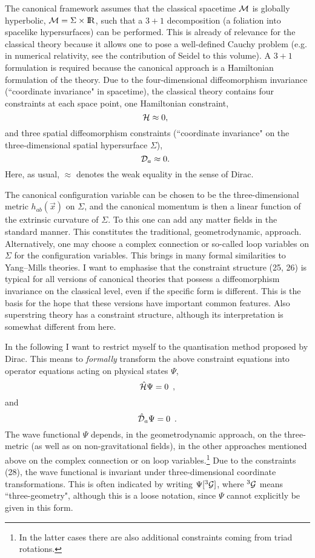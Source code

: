 \documentclass[12pt]{article}
\def\bbbr{{\rm I\!R}} %
\newcommand{\be}{\begin{equation}}
\newcommand{\ee}{\end{equation}}
\begin{document}
The canonical framework assumes that the classical spacetime ${\cal M}$
is globally hyperbolic, ${\cal M}=\Sigma\times\bbbr$, such that 
a $3+1$ decomposition (a foliation into spacelike hypersurfaces)
can be performed. This is already of relevance for the
classical theory because it allows one to pose a well-defined
Cauchy problem (e.g. in numerical relativity, see the
contribution of Seidel to this volume). A $3+1$ formulation
is required because the canonical approach is a Hamiltonian
formulation of the theory.
 Due to the
four-dimensional diffeomorphism invariance (``coordinate
invariance" in spacetime), the classical
theory contains four constraints at each space point,
one Hamiltonian constraint,
\be  {\cal H} \approx 0, \enspace \ee
and three spatial diffeomorphism constraints (``coordinate invariance"
on the three-dimensional spatial hypersurface $\Sigma$),
\be {\cal D}_a \approx 0. \enspace \ee
Here, as usual, $\approx$ denotes the weak equality in the
sense of Dirac.

The canonical configuration variable can
be chosen to be the three-dimensional metric
$h_{ab}(\vec{x})$ on $\Sigma$, and the canonical momentum is then a linear
function of the extrinsic curvature of $\Sigma$. To this one can add
any matter fields in the standard manner. This constitutes the
traditional, geometrodynamic, approach. Alternatively, one may choose
a complex connection or so-called 
loop variables on $\Sigma$ for the configuration
variables. This brings in many formal similarities to
Yang--Mills theories. I want to emphasise that the constraint structure
(25, 26) is typical for all versions of canonical theories that possess a
diffeomorphism invariance on the classical level, even
if the specific form is different. This is the basis for the hope
that these versions have important common features.
Also superstring theory has a constraint structure, although
its interpretation is somewhat different from here.

In the following I want to restrict myself to the quantisation
method proposed by Dirac. This means to {\em formally} transform
the above constraint equations into operator equations acting
on physical states $\Psi$, 
\be \hat{\cal H}\Psi =0 \enspace , \ee
and
\be \hat{\cal D}_a\Psi =0 \enspace . \ee
The wave functional $\Psi$ depends, in the geometrodynamic approach,
on the three-metric (as well as on non-gravitational fields),
in the other approaches mentioned above on the complex connection
or on loop variables.\footnote{In the latter cases there are also
additional constraints coming from triad rotations.}
Due to the constraints (28), the wave functional is invariant under
three-dimensional coordinate transformations. This is often
indicated by writing $\Psi[^3{\cal G}]$, where $^3{\cal G}$ means
``three-geometry", although this is a loose notation, since $\Psi$
cannot explicitly be given in this form.
 
\end{document}
